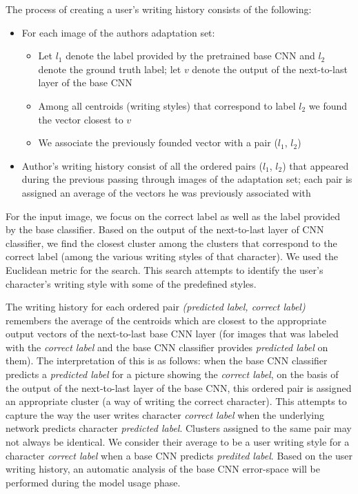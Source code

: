 \documentclass{article}
\begin{document}
The process of creating a user's writing history consists of the following: %
\begin{itemize}
  \item For each image of the authors adaptation set: 
  \begin{itemize}
    \item Let $l_1$ denote the label provided by the pretrained base CNN and $l_2$ denote the ground truth label; 
    let $v$ denote the output of the next-to-last layer of the base CNN 
    \item Among all centroids (writing styles) that correspond to label $l_2$ we found the vector closest to $v$
    \item We associate the previously founded vector with a pair ($l_1$, $l_2$)
  \end{itemize}
  \item Author's writing history consist of all the ordered pairs ($l_1$, $l_2$) that appeared during the previous passing through images of the adaptation set; 
  each pair is assigned an average of the vectors he was previously associated with
  
\end{itemize}

For the input image, we focus on the correct label as well as the label provided by the base classifier.
Based on the output of the next-to-last layer of CNN classifier, we find the closest cluster among the clusters that correspond to the correct label (among the various writing styles of that character).
We used the Euclidean metric for the search. %
This search attempts to identify the user's character's writing style with some of the predefined styles.

The writing history for each ordered pair \textit{(predicted label, correct label)} remembers the average of the centroids 
which are closest to the appropriate output vectors of the next-to-last base CNN layer 
(for images that was labeled with the \textit{correct label} and the base CNN classifier provides \textit{predicted label} on them). 
The interpretation of this is as follows: when the base CNN classifier predicts %
 a \textit{predicted label} for a picture showing the \textit{correct label},
on the basis of the output of the next-to-last layer of the base CNN, this ordered pair is assigned an appropriate cluster (a way of writing the correct character). 
This attempts to capture the way the user writes character \textit{correct label} when the underlying network predicts character \textit{predicted label}. 
Clusters assigned to the same pair may not always be identical.
We consider their average to be %
a user writing style for a character \textit{correct label} when a base CNN predicts \textit{predited label}. 
Based on the user writing history, an automatic analysis of the base CNN error-space will be performed during the model usage phase. 
\end{document}
